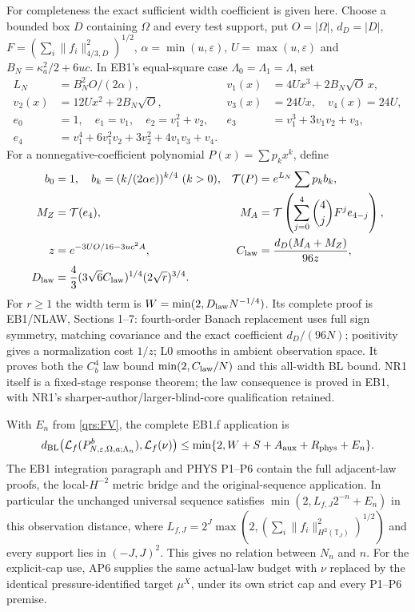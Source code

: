 \documentclass[11pt]{article}
\theoremstyle{plain}
\theoremstyle{definition}
\theoremstyle{remark}
\newcommand{\T}{\mathbb{T}}
\begin{document}
For completeness the exact sufficient width coefficient is given here.
Choose a bounded box $D$ containing $\Omega$ and every test support, put
$O=|\Omega|$, $d_D=|D|$, $F=(\sum_i\|f_i\|_{4/3,D}^2)^{1/2}$,
$\alpha=\min(u,\varepsilon)$, $U=\max(u,\varepsilon)$ and
$B_N=\kappa_a^2/2+6uc$. In EB1's equal-square case
$\Lambda_0=\Lambda_1=\Lambda$, set
\begin{align}
 L_N&=B_N^2O/(2\alpha),
 &v_1(x)&=4Ux^3+2B_N\sqrt O\,x,\nonumber\\
 v_2(x)&=12Ux^2+2B_N\sqrt O,
 &v_3(x)&=24Ux,\quad v_4(x)=24U,\nonumber\\
 e_0&=1,\quad e_1=v_1,\quad e_2=v_1^2+v_2,
 &e_3&=v_1^3+3v_1v_2+v_3,\nonumber\\
 e_4&=v_1^4+6v_1^2v_2+3v_2^2+4v_1v_3+v_4.
 \label{qrs:width-polynomials}
\end{align}
For a nonnegative-coefficient polynomial $P(x)=\sum p_kx^k$, define
\begin{align}
 b_0&=1,\quad b_k=(k/(2\alpha e))^{k/4}\ (k>0),
 &\mathcal T(P)&=e^{L_N}\sum p_kb_k,\nonumber\\
 M_Z&=\mathcal T(e_4),
 &M_A&=\mathcal T\left(\sum_{j=0}^4\binom4j F^je_{4-j}\right),\nonumber\\
 z&=e^{-3UO/16-3uc^2A},
 &C_{\rm law}&=\frac{d_D(M_A+M_Z)}{96z},\nonumber\\
 D_{\rm law}&=\frac43(3\sqrt6 C_{\rm law})^{1/4}
                       (2\sqrt r)^{3/4}.
 \label{qrs:width-coefficient}
\end{align}
For $r\ge1$ the width term is $W=\min(2,D_{\rm law}N^{-1/4})$.
Its complete proof is EB1/NLAW, Sections 1--7: fourth-order Banach
replacement uses full sign symmetry, matching covariance and the exact
coefficient $d_D/(96N)$; positivity gives a normalization cost $1/z$;
L0 smooths in ambient observation space. It proves both the $C_b^4$ law
bound $\min(2,C_{\rm law}/N)$ and this all-width BL bound. NR1 itself is
a fixed-stage response theorem; the law consequence is proved in EB1,
with NR1's sharper-author/larger-blind-core qualification retained.

With $E_n$ from \eqref{qrs:FV}, the complete EB1.f application is
\begin{equation}\label{qrs:five-errors}
 d_{\rm BL}\bigl(\mathcal L_f(P^b_{N,\varepsilon,\Omega,a;\Lambda_n}),
                        \mathcal L_f(\nu)\bigr)
 \le \min\{2,W+S+A_{\rm aux}+R_{\rm phys}+E_n\}.
\end{equation}
The EB1 integration paragraph and PHYS P1--P6 contain the full adjacent-law
proofs, the local-$H^{-2}$ metric bridge and the original-sequence
application. In particular the unchanged universal sequence satisfies
$\min(2,L_{f,J}2^{-n}+E_n)$ in this observation distance, where
$L_{f,J}=2^J\max(2,(\sum_i\|f_i\|_{H^2(\T_J)}^2)^{1/2})$ and every support
lies in $(-J,J)^2$. This gives no relation between $N_n$ and $n$.
For the explicit-cap use, AP6 supplies the same actual-law budget with
$\nu$ replaced by the identical pressure-identified target $\mu^X$,
under its own strict cap and every P1--P6 premise.
\end{document}
